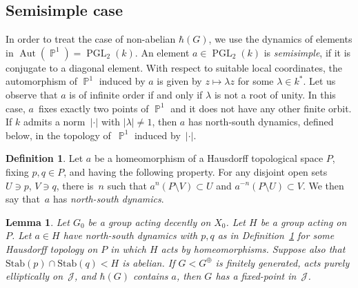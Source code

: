 \documentclass[11pt]{article}
\numberwithin{equation}{section}
\newcommand{\p}{\operatorname{\mathbb{P}}}\let\P\p
\newcommand{\Aut}{\operatorname{Aut}}
\newcommand{\PGL}{\operatorname{PGL}}
\newcommand{\Jon}{\mathscr{J}}
\theoremstyle{plain}
\newtheorem{lemma}[theorem]{Lemma}
\theoremstyle{definition}
\newtheorem{definition}[theorem]{Definition}
\begin{document}
\subsection{Semisimple case}

In order to treat the case of non-abelian $\hbar(G)$, we use the dynamics of elements in $\Aut(\p^1)=\PGL_2(k)$.
An element $a\in\PGL_2(k)$ is \emph{semisimple}, if it is conjugate to a diagonal element. With respect to suitable local coordinates, the automorphism of $\p^1$ induced by $a$ is given by $z\mapsto \lambda z$ for some $\lambda\in k^*$. Let us observe that $a$ is of infinite order if and only if $\lambda$ is not a root of unity. In this case, $a$~fixes exactly two points of $\p^1$ and it does not have any other finite orbit. If $k$ admits a norm~$|\cdot|$ with $|\lambda|\neq 1$, then $a$ has north-south dynamics, defined below, in the topology of~$\p^1$ induced by~$|\cdot|$.

\begin{definition}
\label{def:NS}
Let $a$ be a homeomorphism of a Hausdorff topological space $P$, fixing $p,q\in P$, and having the following property. For any disjoint open sets $U\ni p$, $V\ni q$, there is~$n$ such that $a^n(P\setminus V)\subset U$ and $a^{-n}(P\setminus U)\subset V$.
We then say that~$a$ has \emph{north-south dynamics}.
\end{definition}

\begin{lemma}
\label{lem:semisimple}
Let $G_0$ be a group acting decently on $X_0$. Let $H$ be a group acting on $P$. Let $a\in H$ have north-south dynamics {with $p,q$ as in Definition~\ref{def:NS}} for some Hausdorff topology on $P$ in which $H$ acts by homeomorphisms. Suppose also that \hbox{$\mathrm{Stab}(p)\cap\mathrm{Stab}(q)<H$} is abelian.
If $G<G^\oplus$ is finitely generated, acts purely elliptically on~$\Jon$, and $\hbar(G)$ contains $a$, then $G$ has a fixed-point in~$\Jon$.
\end{lemma}
\end{document}
